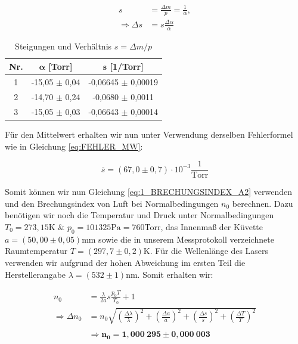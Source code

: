 \documentclass{article}
\begin{document}
\begin{equation}
    \begin{split}
        s &= \frac{\Delta m}{p} = \frac{1}{\alpha}, \\
        \Rightarrow \Delta s &= s \frac{\Delta \alpha}{\alpha}
    \end{split}
\end{equation}

\phantom{.}

\begin{table}[!h]
    \centering
    \begin{tabular}{ccc}
        \hline
        \textbf{Nr.} & $\bm{\alpha}$ [Torr] & $\bm{s}$ [1/Torr] \\ \hline
             1 & -15,05  $\pm$ 0,04 & -0,06645 $\pm$ 0,00019 \\
             2 & -14,70  $\pm$ 0,24 & -0,0680 $\pm$ 0,0011  \\
             3 & -15,05  $\pm$ 0,03 & -0,06643 $\pm$ 0,00014 \\ \hline
    \end{tabular}%
    \caption{Steigungen und Verhältnis $s = \Delta m/p$}
    \label{tab:STEIGUNGEN}
\end{table}

\phantom{.}

Für den Mittelwert erhalten wir nun unter Verwendung derselben Fehlerformel wie in Gleichung \ref{eq:FEHLER_MW}:

\begin{equation}
    \overline{s} = (67,0 \pm 0,7) \cdot 10^{-3} \frac{1}{\text{Torr}}
\end{equation}

Somit können wir nun Gleichung \ref{eq:1_BRECHUNGSINDEX_A2} verwenden und den Brechungsindex von Luft bei Normalbedingungen $n_0$ berechnen. Dazu benötigen wir noch die Temperatur und Druck unter Normalbedingungen $T_0 = 273,15$K \& $p_0 = 101325 \text{Pa} = 760$Torr, das Innenmaß der Küvette $a = (50,00 \pm 0,05)$mm sowie die in unserem Messprotokoll verzeichnete Raumtemperatur $T = (297,7 \pm 0,2)$K. Für die Wellenlänge des Lasers verwenden wir aufgrund der hohen Abweichung im ersten Teil die Herstellerangabe $\lambda = (532 \pm 1)$nm. Somit erhalten wir:

\begin{equation}
    \begin{split}
        n_0 &= \frac{\lambda}{2a} s \frac{p_0 T}{T_0} + 1 \\
        \Rightarrow \Delta n_0 &= n_0 \sqrt{\left( \frac{\Delta \lambda}{\lambda} \right)^2 + \left( \frac{\Delta a}{a} \right)^2 + \left( \frac{\Delta s}{s} \right)^2 + \left( \frac{\Delta T}{T} \right)^2} \\ \\
        &\Rightarrow \bm{n_0 = 1,000 \ 295 \pm 0,000 \ 003} 
    \end{split}
\end{equation}
\end{document}
